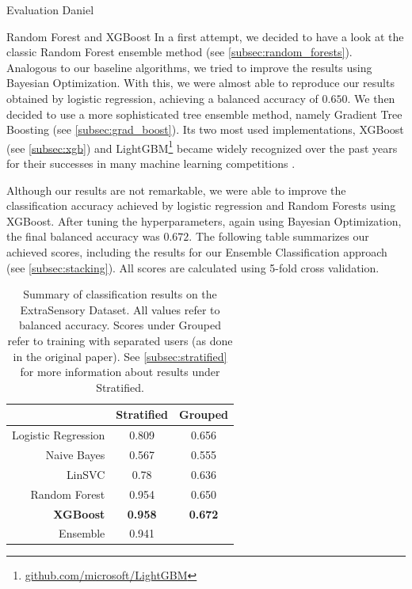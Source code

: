 \begin{section}{Evaluation Daniel}
	\begin{subsection}{Random Forest and XGBoost}
		In a first attempt, we decided to have a look at the classic Random Forest ensemble method (see \ref{subsec:random_forests}). Analogous to our baseline algorithms, we tried to improve the results using Bayesian Optimization. With this, we were almost able to reproduce our results obtained by logistic regression, achieving a balanced accuracy of $0.650$. We then decided to use a more sophisticated tree ensemble method, namely Gradient Tree Boosting (see \ref{subsec:grad_boost}). Its two most used implementations, XGBoost (see \ref{subsec:xgb}) and LightGBM\footnote{\href{https://github.com/microsoft/LightGBM}{github.com/microsoft/LightGBM}} became widely recognized over the past years for their successes in many machine learning competitions \cite{Chen16}. \par
		Although our results are not remarkable, we were able to improve the classification accuracy achieved by logistic regression and Random Forests using XGBoost. After tuning the hyperparameters, again using Bayesian Optimization, the final balanced accuracy was $0.672$.  The following table summarizes our achieved scores, including the results for our Ensemble Classification approach (see \ref{subsec:stacking}). All scores are calculated using 5-fold cross validation.
		\begin{table}[H]
			\begin{center} 
				\begin{tabular}{r|c|c}
					\toprule
					& Stratified & Grouped \\
					\midrule
					Logistic Regression & 0.809 & 0.656 \\
					Naive Bayes & 0.567 & 0.555 \\
					LinSVC & 0.78 & 0.636 \\
					Random Forest & 0.954 & 0.650 \\
					\textbf{XGBoost} & \textbf{0.958} & \textbf{0.672} \\
					\midrule
					Ensemble & 0.941 & \\
					\bottomrule
				\end{tabular}
			\end{center}
			\caption{Summary of classification results on the ExtraSensory Dataset. All values refer to balanced accuracy. Scores under \glqq Grouped\grqq{} refer to training with separated users (as done in the original paper). See \ref{subsec:stratified} for more information about results under \glqq Stratified\grqq.}
			\label{table:results}
		\end{table}
	\end{subsection}


\end{section}

